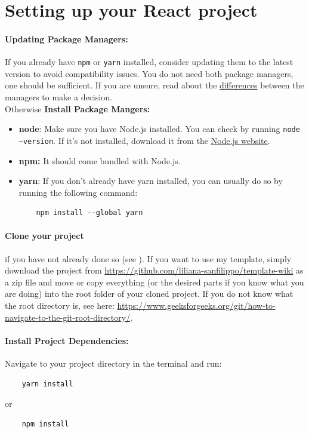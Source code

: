 

\section{Setting up your React project}\label{sec:setting-up-your-react-project}

\paragraph{Updating Package Managers:}  If you already have \texttt{npm} or \texttt{yarn} installed, consider
updating them to the latest version to avoid compatibility issues.
You do not need both package managers, one should be sufficient.
If you are unsure, read about the
\href{https://www.geeksforgeeks.org/node-js/difference-between-npm-and-yarn/}{differences} between the managers to
make a decision. \\
Otherwise \textbf{Install Package Mangers:}     
\begin{itemize}
    \item \textbf{node}: Make sure you have Node.js installed.
    You can check by running \texttt{node --version}.
    If it’s not installed, download it from the \href{https://nodejs.org/}{Node.js website}.
    \item \textbf{npm:} It should come bundled with Node.js.
    \item \textbf{yarn}: If you don't already have yarn installed, you can usually do so by running the following
    command: \begin{verbatim}
    npm install --global yarn
    \end{verbatim}
\end{itemize}

\paragraph{Clone your project} if you have not already done so (see ).
If you want to use my template, simply download the project from \url{https://github.com/liliana-sanfilippo/template-wiki} as a zip file and move or copy everything (or the desired parts if you know what you are doing) into the root folder of your cloned project.
If you do not know what the root directory is, see here: \url{https://www.geeksforgeeks.org/git/how-to-navigate-to-the-git-root-directory/}.

\paragraph{Install Project Dependencies:} Navigate to your project directory in the terminal and run:
\begin{verbatim}
    yarn install
\end{verbatim}
or
\begin{verbatim}
    npm install
\end{verbatim}

